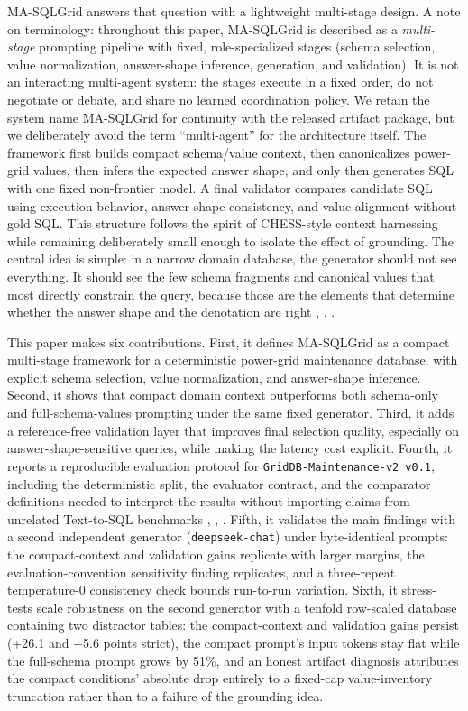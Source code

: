 \documentclass{ieeeaccess}
\begin{document}
MA-SQLGrid answers that question with a lightweight multi-stage design. A note on terminology: throughout this paper, MA-SQLGrid is described as a \emph{multi-stage} prompting pipeline with fixed, role-specialized stages (schema selection, value normalization, answer-shape inference, generation, and validation). It is not an interacting multi-agent system: the stages execute in a fixed order, do not negotiate or debate, and share no learned coordination policy. We retain the system name MA-SQLGrid for continuity with the released artifact package, but we deliberately avoid the term ``multi-agent'' for the architecture itself. The framework first builds compact schema/value context, then canonicalizes power-grid values, then infers the expected answer shape, and only then generates SQL with one fixed non-frontier model. A final validator compares candidate SQL using execution behavior, answer-shape consistency, and value alignment without gold SQL. This structure follows the spirit of CHESS-style context harnessing \cite{talaei2024chess} while remaining deliberately small enough to isolate the effect of grounding. The central idea is simple: in a narrow domain database, the generator should not see everything. It should see the few schema fragments and canonical values that most directly constrain the query, because those are the elements that determine whether the answer shape and the denotation are right \cite{wu2022chains}, \cite{xie2022unifiedskg}, \cite{li2024select}.

This paper makes six contributions. First, it defines MA-SQLGrid as a compact multi-stage framework for a deterministic power-grid maintenance database, with explicit schema selection, value normalization, and answer-shape inference. Second, it shows that compact domain context outperforms both schema-only and full-schema-values prompting under the same fixed generator. Third, it adds a reference-free validation layer that improves final selection quality, especially on answer-shape-sensitive queries, while making the latency cost explicit. Fourth, it reports a reproducible evaluation protocol for \texttt{GridDB-Maintenance-v2\ v0.1}, including the deterministic split, the evaluator contract, and the comparator definitions needed to interpret the results without importing claims from unrelated Text-to-SQL benchmarks \cite{zhong2020semantic}, \cite{lee2021kaggledbqa}, \cite{lei2024spider}. Fifth, it validates the main findings with a second independent generator (\texttt{deepseek-chat}) under byte-identical prompts: the compact-context and validation gains replicate with larger margins, the evaluation-convention sensitivity finding replicates, and a three-repeat temperature-0 consistency check bounds run-to-run variation. Sixth, it stress-tests scale robustness on the second generator with a tenfold row-scaled database containing two distractor tables: the compact-context and validation gains persist (+26.1 and +5.6 points strict), the compact prompt's input tokens stay flat while the full-schema prompt grows by 51\%, and an honest artifact diagnosis attributes the compact conditions' absolute drop entirely to a fixed-cap value-inventory truncation rather than to a failure of the grounding idea.
\end{document}
